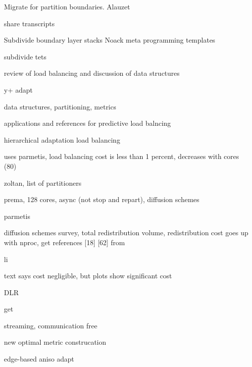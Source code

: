 \documentclass{article}
\begin{document}
Migrate for partition boundaries. 
Alauzet\cite{alauzet-li-seol-shephard-para-aniso}
\cite{kallinderis-load-balance}
\cite{lepage}
\cite{cavallo-para-adapt}
\cite{cavallo-phd-thesis}

share transcripts
\cite{park-darmofal-parallel-aniso-adapt-aiaa}
\cite{park-phd-thesis}

Subdivide boundary layer stacks
\cite{rpi-ec-2008-adapt-bl-visc}
\cite{kallinderis-adapt}
\cite{mavriplis-3d-adapt-mixed-subdivision}
\cite{lapage-habashi-3d-aniso-2002}
\cite{cavallo-phd-thesis}
\cite{kim-nakahashi-adjoint-adapt-viscous}
Noack meta programming templates\cite{noack-unstruct-mixed-adapt-template}

subdivide tets
\cite{rausch-unsteady-adaptation-3d}
\cite{waltz:2003}

review of load balancing and discussion of data structures
\cite{kallinderis-kavouklis-adapt-3d-hybrid,%
      kavouklis-kallinderis-parallel-3d-hybrid-adapt}

y+ adapt\cite{knopp-alrutz-schwambor-adapt-grid-wall-func-rans}

data structures, partitioning, metrics
\cite{flaherty-parallel-data-structures,teresco-phd-thesis-para-adapt-part-load-balancing}

applications and references for predictive load balncing
\cite{dindar-shephard-flaherty-adapt-rotorcraft-tc-rotor}

hierarchical adaptation\cite{kallinderis-parallel}
load balancing\cite{minyard-kallinderis-load-balance}

uses parmetis, load balancing cost is less than 1 percent, decreases with cores (80)
\cite{eccomas-2010-para-perf-adapt}

zoltan, list of partitioners
\cite{devine-anm-2005-zoltan-load-balancing}

prema, 128 cores, async (not stop and repart), diffusion schemes
\cite{chrisochoides-ieee-tpds-2004-load-balance}

parmetis
\cite{parmetis-sc-2000}

diffusion schemes survey, total redistribution volume, redistribution cost goes up with nproc,
get references [18] [62] from
\cite{oliker-thesis}

li
\cite{li-masters-thesis,li-load-balance}

text says cost negligible, but plots show significant cost
\cite{park-para-unsteady-adapt}

DLR\cite{tau-para-adapt-hybrid-eccomas}

get
\cite{selwood}

streaming, communication free\cite{pebay-parallel-adapt}


new optimal metric construcation
\cite{yano-darmofal-opt-framework-simplex-adapt}

edge-based aniso adapt
\cite{michal-krakos-aniso-adapt-edge}
\cite{loseille-lohner-imr18-3d-aniso-adapt-surf-vol-bl}



\end{document}
